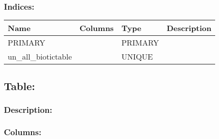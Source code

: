 \documentclass[letterpaper,10pt,english]{sphinxmanual}
\begin{document}
\subsubsection{Indices:}
\label{\detokenize{schema_documentation:id3}}

\begin{savenotes}\sphinxattablestart
\centering
\begin{tabulary}{\linewidth}[t]{|T|T|T|T|}
\hline
\sphinxstyletheadfamily 
Name
&\sphinxstyletheadfamily 
Columns
&\sphinxstyletheadfamily 
Type
&\sphinxstyletheadfamily 
Description
\\
\hline
PRIMARY
&
&
PRIMARY
&\\
\hline
un\_all\_biotictable
&
&
UNIQUE
&\\
\hline
\end{tabulary}
\par
\sphinxattableend\end{savenotes}


\subsection{Table: }
\label{\detokenize{schema_documentation:table-contact}}

\subsubsection{Description:}
\label{\detokenize{schema_documentation:id4}}

\subsubsection{Columns:}
\label{\detokenize{schema_documentation:id5}}
\end{document}
